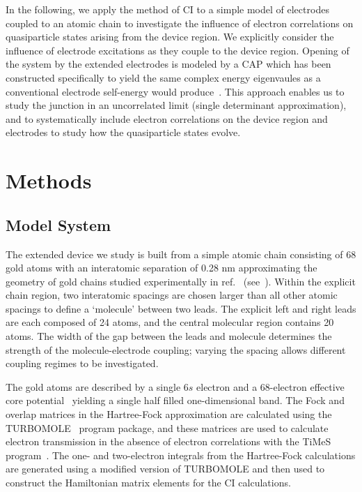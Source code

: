 In the following, we apply the method of \ac{CI} to a simple model of
electrodes coupled to an atomic chain to investigate the influence of
electron correlations on quasiparticle states arising from the device
region. We explicitly consider the influence of electrode excitations as
they couple to the device region. Opening of the system by the extended
electrodes is modeled by a \ac{CAP} which has been constructed specifically
to yield the same complex energy eigenvaules as a conventional electrode
self-energy would produce~\cite{henderson}. This approach enables us to study
the junction in an uncorrelated limit (single determinant approximation), and
to systematically include electron correlations on the device region and
electrodes to study how the quasiparticle states evolve. 

\section{Methods}
\label{sec:method}

\subsection{Model System}
\label{subsec:modelsystem}

The extended device we study is built from a simple atomic chain
consisting of 68 gold atoms with an interatomic separation of 0.28 nm
approximating the geometry of gold chains studied experimentally in
ref.~\cite{nilius2002science} (see~).
Within the explicit chain region, two interatomic spacings are chosen
larger than all other atomic spacings to define a `molecule' between two
leads. The explicit left and right leads are each composed of 24 atoms,
and the central molecular region contains 20 atoms. The width of the gap
between the leads and molecule determines the strength of the
molecule-electrode coupling; varying the spacing allows different
coupling regimes to be investigated. 

The gold atoms are described by a single 6$s$ electron and a 68-electron
effective core potential~\cite{CRENBS} yielding a single half filled
one-dimensional band. The Fock and overlap matrices in the Hartree-Fock
approximation are calculated  using the TURBOMOLE~\cite{turbomole} program
package, and these matrices are used to calculate electron transmission
in the absence of electron correlations with the TiMeS  program~\cite{times}.
The one- and two-electron integrals from the Hartree-Fock calculations
are generated using a modified version of TURBOMOLE and then used to
construct the Hamiltonian matrix elements for the CI calculations.

